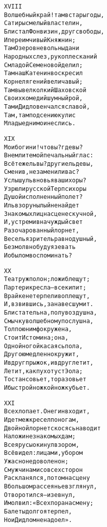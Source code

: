 \begin{minipage}[t]{\dimexpr 0.5\textwidth -\tabcolsep-.5pt}
\begin{alltt}\normalfont\centering
XVIII
Волшебный край! там в стары годы,
Сатиры смелый властелин,
Блистал Фонвизин, друг свободы,
И переимчивый Княжнин;
Там Озеров невольны дани
Народных слез, рукоплесканий
С младой Семеновой делил;
Там наш Катенин воскресил
Корнеля гений величавый;
Там вывел колкий Шаховской
Своих комедий шумный рой,
Там и Дидло венчался славой,
Там, там под сению кулис
Младые дни мои неслись.
\end{alltt}
\end{minipage}
\clearpage

\begin{minipage}[t]{\dimexpr 0.5\textwidth -\tabcolsep-.5pt}
\begin{alltt}\normalfont\centering
XIX
Мои богини! что вы? где вы?
Внемлите мой печальный глас:
Всё те же ль вы? другие ль девы,
Сменив, не заменили вас?
Услышу ль вновь я ваши хоры?
Узрю ли русской Терпсихоры
Душой исполненный полет?
Иль взор унылый не найдет
Знакомых лиц на сцене скучной,
И, устремив на чуждый свет
Разочарованный лорнет,
Веселья зритель равнодушный,
Безмолвно буду я зевать
И о былом воспоминать?
\end{alltt}
\end{minipage}

\begin{minipage}[t]{\dimexpr 0.5\textwidth -\tabcolsep-.5pt}
\begin{alltt}\normalfont\centering
XX
Театр уж полон; ложи блещут;
Партер и кресла — все кипит;
В райке нетерпеливо плещут,
И, взвившись, занавес шумит.
Блистательна, полувоздушна,
Смычку волшебному послушна,
Толпою нимф окружена,
Стоит Истомина; она,
Одной ногой касаясь пола,
Другою медленно кружит,
И вдруг прыжок, и вдруг летит,
Летит, как пух от уст Эола;
То стан совьет, то разовьет
И быстрой ножкой ножку бьет.
\end{alltt}
\end{minipage}
\clearpage

\begin{minipage}[t]{\dimexpr 0.5\textwidth -\tabcolsep-.5pt}
\begin{alltt}\normalfont\centering
XXI
Все хлопает. Онегин входит,
Идет меж кресел по ногам,
Двойной лорнет скосясь наводит
На ложи незнакомых дам;
Все ярусы окинул взором,
Всё видел: лицами, убором
Ужасно недоволен он;
С мужчинами со всех сторон
Раскланялся, потом на сцену
В большом рассеянье взглянул,
Отворотился — и зевнул,
И молвил: «Всех пора на смену;
Балеты долго я терпел,
Но и Дидло мне надоел».
\end{alltt}
\end{minipage}

